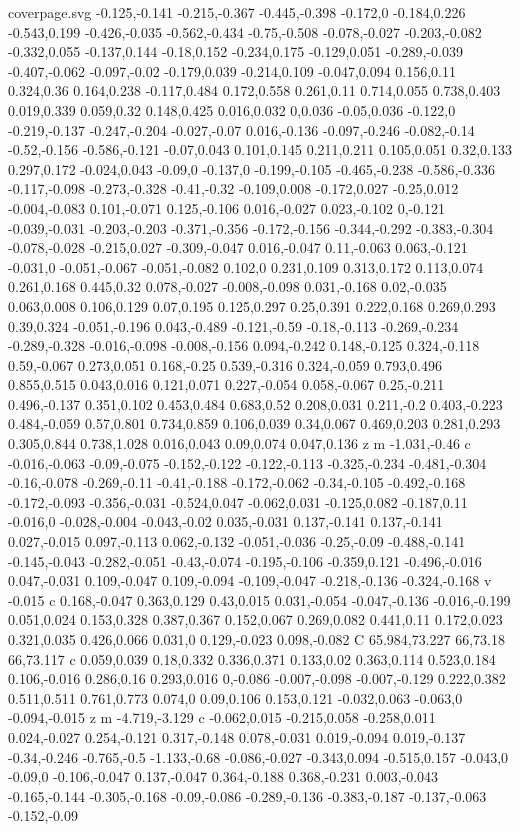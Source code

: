 \begin{filecontents}[noheader]{coverpage.svg}
-0.125,-0.141 -0.215,-0.367 -0.445,-0.398 -0.172,0 -0.184,0.226 -0.543,0.199 -0.426,-0.035 -0.562,-0.434 -0.75,-0.508 -0.078,-0.027 -0.203,-0.082 -0.332,0.055 -0.137,0.144 -0.18,0.152 -0.234,0.175 -0.129,0.051 -0.289,-0.039 -0.407,-0.062 -0.097,-0.02 -0.179,0.039 -0.214,0.109 -0.047,0.094 0.156,0.11 0.324,0.36 0.164,0.238 -0.117,0.484 0.172,0.558 0.261,0.11 0.714,0.055 0.738,0.403 0.019,0.339 0.059,0.32 0.148,0.425 0.016,0.032 0,0.036 -0.05,0.036 -0.122,0 -0.219,-0.137 -0.247,-0.204 -0.027,-0.07 0.016,-0.136 -0.097,-0.246 -0.082,-0.14 -0.52,-0.156 -0.586,-0.121 -0.07,0.043 0.101,0.145 0.211,0.211 0.105,0.051 0.32,0.133 0.297,0.172 -0.024,0.043 -0.09,0 -0.137,0 -0.199,-0.105 -0.465,-0.238 -0.586,-0.336 -0.117,-0.098 -0.273,-0.328 -0.41,-0.32 -0.109,0.008 -0.172,0.027 -0.25,0.012 -0.004,-0.083 0.101,-0.071 0.125,-0.106 0.016,-0.027 0.023,-0.102 0,-0.121 -0.039,-0.031 -0.203,-0.203 -0.371,-0.356 -0.172,-0.156 -0.344,-0.292 -0.383,-0.304 -0.078,-0.028 -0.215,0.027 -0.309,-0.047 0.016,-0.047 0.11,-0.063 0.063,-0.121 -0.031,0 -0.051,-0.067 -0.051,-0.082 0.102,0 0.231,0.109 0.313,0.172 0.113,0.074 0.261,0.168 0.445,0.32 0.078,-0.027 -0.008,-0.098 0.031,-0.168 0.02,-0.035 0.063,0.008 0.106,0.129 0.07,0.195 0.125,0.297 0.25,0.391 0.222,0.168 0.269,0.293 0.39,0.324 -0.051,-0.196 0.043,-0.489 -0.121,-0.59 -0.18,-0.113 -0.269,-0.234 -0.289,-0.328 -0.016,-0.098 -0.008,-0.156 0.094,-0.242 0.148,-0.125 0.324,-0.118 0.59,-0.067 0.273,0.051 0.168,-0.25 0.539,-0.316 0.324,-0.059 0.793,0.496 0.855,0.515 0.043,0.016 0.121,0.071 0.227,-0.054 0.058,-0.067 0.25,-0.211 0.496,-0.137 0.351,0.102 0.453,0.484 0.683,0.52 0.208,0.031 0.211,-0.2 0.403,-0.223 0.484,-0.059 0.57,0.801 0.734,0.859 0.106,0.039 0.34,0.067 0.469,0.203 0.281,0.293 0.305,0.844 0.738,1.028 0.016,0.043 0.09,0.074 0.047,0.136 z m -1.031,-0.46 c -0.016,-0.063 -0.09,-0.075 -0.152,-0.122 -0.122,-0.113 -0.325,-0.234 -0.481,-0.304 -0.16,-0.078 -0.269,-0.11 -0.41,-0.188 -0.172,-0.062 -0.34,-0.105 -0.492,-0.168 -0.172,-0.093 -0.356,-0.031 -0.524,0.047 -0.062,0.031 -0.125,0.082 -0.187,0.11 -0.016,0 -0.028,-0.004 -0.043,-0.02 0.035,-0.031 0.137,-0.141 0.137,-0.141 0.027,-0.015 0.097,-0.113 0.062,-0.132 -0.051,-0.036 -0.25,-0.09 -0.488,-0.141 -0.145,-0.043 -0.282,-0.051 -0.43,-0.074 -0.195,-0.106 -0.359,0.121 -0.496,-0.016 0.047,-0.031 0.109,-0.047 0.109,-0.094 -0.109,-0.047 -0.218,-0.136 -0.324,-0.168 v -0.015 c 0.168,-0.047 0.363,0.129 0.43,0.015 0.031,-0.054 -0.047,-0.136 -0.016,-0.199 0.051,0.024 0.153,0.328 0.387,0.367 0.152,0.067 0.269,0.082 0.441,0.11 0.172,0.023 0.321,0.035 0.426,0.066 0.031,0 0.129,-0.023 0.098,-0.082 C 65.984,73.227 66,73.18 66,73.117 c 0.059,0.039 0.18,0.332 0.336,0.371 0.133,0.02 0.363,0.114 0.523,0.184 0.106,-0.016 0.286,0.16 0.293,0.016 0,-0.086 -0.007,-0.098 -0.007,-0.129 0.222,0.382 0.511,0.511 0.761,0.773 0.074,0 0.09,0.106 0.153,0.121 -0.032,0.063 -0.063,0 -0.094,-0.015 z m -4.719,-3.129 c -0.062,0.015 -0.215,0.058 -0.258,0.011 0.024,-0.027 0.254,-0.121 0.317,-0.148 0.078,-0.031 0.019,-0.094 0.019,-0.137 -0.34,-0.246 -0.765,-0.5 -1.133,-0.68 -0.086,-0.027 -0.343,0.094 -0.515,0.157 -0.043,0 -0.09,0 -0.106,-0.047 0.137,-0.047 0.364,-0.188 0.368,-0.231 0.003,-0.043 -0.165,-0.144 -0.305,-0.168 -0.09,-0.086 -0.289,-0.136 -0.383,-0.187 -0.137,-0.063 -0.152,-0.09 
\end{filecontents}
